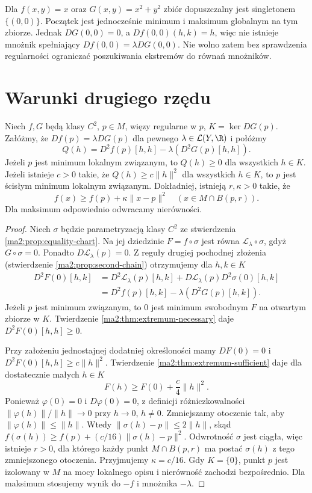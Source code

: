 \begin{przyklad}
\label{ma2:ex:singular-constraint}
Dla $f(x,y)=x$ oraz $G(x,y)=x^2+y^2$ zbiór
dopuszczalny jest singletonem $\{(0,0)\}$.
Początek jest jednocześnie minimum i maksimum
globalnym na tym zbiorze. Jednak $DG(0,0)=0$,
a $Df(0,0)(h,k)=h$, więc nie istnieje mnożnik
spełniający $Df(0,0)=\lambda DG(0,0)$.
Nie wolno zatem bez sprawdzenia regularności
ograniczać poszukiwania ekstremów do równań
mnożników.
\end{przyklad}

\section{Warunki drugiego rzędu}

\begin{twierdzenie}
\label{ma2:thm:constrained-second}
Niech $f,G$ będą klasy $C^2$, $p\in M$, więzy
regularne w $p$, $K=\ker DG(p)$. Załóżmy, że
$Df(p)=\lambda DG(p)$ dla pewnego
$\lambda\in\mathcal L(Y,\R)$ i połóżmy
\[
 Q(h)=D^2f(p)[h,h]-\lambda(D^2G(p)[h,h]).
\]
Jeżeli $p$ jest minimum lokalnym związanym, to $Q(h)\ge0$
dla wszystkich $h\in K$. Jeżeli istnieje $c>0$ takie,
że $Q(h)\ge c\|h\|^2$ dla wszystkich $h\in K$, to
$p$ jest ścisłym minimum lokalnym związanym.
Dokładniej, istnieją $r,\kappa>0$ takie, że
\[
 f(x)\ge f(p)+\kappa\|x-p\|^2
 \quad(x\in M\cap B(p,r)).
\]
Dla maksimum odpowiednio odwracamy nierówności.
\end{twierdzenie}
\begin{proof}
Niech $\sigma$ będzie parametryzacją klasy $C^2$
ze stwierdzenia \ref{ma2:prop:equality-chart}.
Na jej dziedzinie $F=f\circ\sigma$ jest równa
$\mathcal{L}_\lambda\circ\sigma$, gdyż $G\circ\sigma=0$.
Ponadto $D\mathcal{L}_\lambda(p)=0$.
Z reguły drugiej pochodnej złożenia
(stwierdzenie \ref{ma2:prop:second-chain}) otrzymujemy
dla $h,k\in K$
\[
 \begin{aligned}
 D^2F(0)[h,k]
 &=
 D^2\mathcal{L}_\lambda(p)[h,k]
 +D\mathcal{L}_\lambda(p)D^2\sigma(0)[h,k]\\
 &=
 D^2f(p)[h,k]-\lambda(D^2G(p)[h,k]).
 \end{aligned}
\]
Jeżeli $p$ jest minimum związanym, to $0$ jest
minimum swobodnym $F$ na otwartym zbiorze w $K$.
Twierdzenie \ref{ma2:thm:extremum-necessary}
daje $D^2F(0)[h,h]\ge0$.

Przy założeniu jednostajnej dodatniej określoności
mamy $DF(0)=0$ i $D^2F(0)[h,h]\ge c\|h\|^2$.
Twierdzenie \ref{ma2:thm:extremum-sufficient}
daje dla dostatecznie małych $h\in K$
\[
 F(h)\ge F(0)+\frac c4\|h\|^2.
\]
Ponieważ $\varphi(0)=0$ i $D\varphi(0)=0$,
z definicji różniczkowalności
$\|\varphi(h)\|/\|h\|\to0$ przy $h\to0$, $h\ne0$.
Zmniejszamy otoczenie tak, aby
$\|\varphi(h)\|\le\|h\|$. Wtedy
$\|\sigma(h)-p\|\le2\|h\|$, skąd
$f(\sigma(h))\ge f(p)+(c/16)\|\sigma(h)-p\|^2$.
Odwrotność $\sigma$ jest ciągła, więc istnieje
$r>0$, dla którego każdy punkt $M\cap B(p,r)$
ma postać $\sigma(h)$ z tego zmniejszonego
otoczenia. Przyjmujemy $\kappa=c/16$.
Gdy $K=\{0\}$, punkt $p$ jest izolowany w $M$
na mocy lokalnego opisu i nierówność zachodzi
bezpośrednio. Dla maksimum stosujemy wynik
do $-f$ i mnożnika $-\lambda$.
\end{proof}

